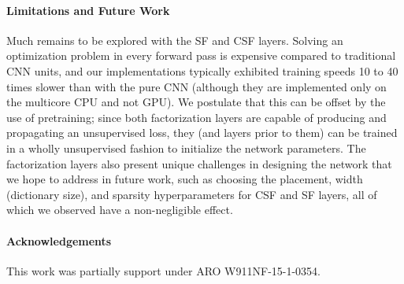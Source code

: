 \documentclass[10pt,twocolumn,letterpaper]{article}
\begin{document}
\paragraph{Limitations and Future Work}
Much remains to be explored with the SF and CSF layers. Solving an optimization problem in every forward pass is expensive compared to traditional CNN units, and our implementations typically exhibited training speeds 10 to 40 times slower than with the pure CNN (although they are implemented only on the multicore CPU and not GPU). We postulate that this can be offset by the use of pretraining; since both factorization layers are capable of producing and propagating an unsupervised loss, they (and layers prior to them) can be trained in a wholly unsupervised fashion to initialize the network parameters. The factorization layers also present unique challenges in designing the network that we hope to address in future work, such as choosing the placement, width (dictionary size), and sparsity hyperparameters for CSF and SF layers, all of which we observed have a non-negligible effect.  

\paragraph{Acknowledgements} This work was partially support under ARO W911NF-15-1-0354.
\end{document}
